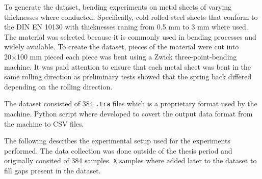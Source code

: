 To generate the dataset, bending experiments on metal sheets of varying
thicknesses where conducted.
Specifically, cold rolled steel sheets that conform to the DIN EN
10130 with thicknesses raning from 0.5 mm to 3 mm where used.
The material was selected because it is commonly used in bending processes and widely
available.
To create the dataset, pieces of the material were cut into 20×100 mm pieced each piece
was bent using a Zwick three-point-bending machine.
It was paid attention to ensure that each metal sheet was bent in the same
rolling direction as preliminary tests showed that the spring back differed depending
on the rolling direction.

The dataset consisted of 384 \texttt{.tra} files which is a proprietary format used by
the machine.
Python script where developed to covert the output data format from the
machine to CSV files.

The following describes the experimental setup used for the experiments
performed.
The data collection was done outside of the thesis period and originally consited of 384
samples. \texttt{X} samples where added later to the dataset to fill gaps present in
the dataset.


